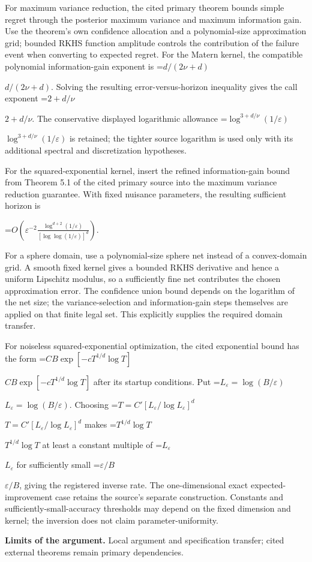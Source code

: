 \documentclass[10pt,a4paper]{article}
\newcommand{\AtlasMath}[1]{\par\begingroup\centering\setbox0=\hbox{$\displaystyle #1$}\ifdim\wd0>1.4\linewidth\typeout{ATLAS WIDE FORMULA: \the\wd0}\fi\ifdim\wd0>\linewidth\resizebox{\linewidth}{!}{\box0}\else\box0\fi\par\endgroup}
\newcommand{\AtlasInlineMath}[1]{\begingroup\setbox0=\hbox{$#1$}\ifdim\wd0>.4\linewidth\endgroup\AtlasMath{#1}\else\endgroup$#1$\fi}
\begin{document}
For maximum variance reduction, the cited primary theorem bounds simple regret through the posterior maximum variance and maximum information gain. Use the theorem's own confidence allocation and a polynomial-size approximation grid; bounded RKHS function amplitude controls the contribution of the failure event when converting to expected regret. For the Matern kernel, the compatible polynomial information-gain exponent is \AtlasInlineMath{d/(2\nu+d)}. Solving the resulting error-versus-horizon inequality gives the call exponent \AtlasInlineMath{2+d/\nu}. The conservative displayed logarithmic allowance \AtlasInlineMath{\log^{3+d/\nu}(1/\varepsilon)} is retained; the tighter source logarithm is used only with its additional spectral and discretization hypotheses.

For the squared-exponential kernel, insert the refined information-gain bound from Theorem 5.1 of the cited primary source into the maximum variance reduction guarantee. With fixed nuisance parameters, the resulting sufficient horizon is

\AtlasMath{O\!\left(\varepsilon^{-2}\frac{\log^{d+2}(1/\varepsilon)}{[\log\log(1/\varepsilon)]^d}\right).}

For a sphere domain, use a polynomial-size sphere net instead of a convex-domain grid. A smooth fixed kernel gives a bounded RKHS derivative and hence a uniform Lipschitz modulus, so a sufficiently fine net contributes the chosen approximation error. The confidence union bound depends on the logarithm of the net size; the variance-selection and information-gain steps themselves are applied on that finite legal set. This explicitly supplies the required domain transfer.

For noiseless squared-exponential optimization, the cited exponential bound has the form \AtlasInlineMath{C B\exp[-cT^{1/d}\log T]} after its startup conditions. Put \AtlasInlineMath{L_\varepsilon=\log(B/\varepsilon)}. Choosing \AtlasInlineMath{T=C'[L_\varepsilon/\log L_\varepsilon]^d} makes \AtlasInlineMath{T^{1/d}\log T} at least a constant multiple of \AtlasInlineMath{L_\varepsilon} for sufficiently small \AtlasInlineMath{\varepsilon/B}, giving the registered inverse rate. The one-dimensional exact expected-improvement case retains the source's separate construction. Constants and sufficiently-small-accuracy thresholds may depend on the fixed dimension and kernel; the inversion does not claim parameter-uniformity.

\textbf{Limits of the argument.} Local argument and specification transfer; cited external theorems remain primary dependencies.
\end{document}
